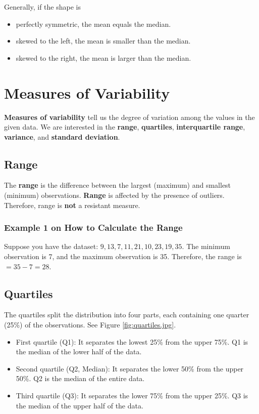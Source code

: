 Generally, if the shape is
\begin{itemize}
    \item perfectly symmetric, the mean equals the median.
    \item skewed to the left, the mean is smaller than the median.
    \item skewed to the right, the mean is larger than the median.
\end{itemize}

\section{Measures of Variability}
\textbf{Measures of variability} tell us the degree of variation among the values in the given data. We are interested in the \textbf{range}, \textbf{quartiles}, \textbf{interquartile range}, \textbf{variance}, and \textbf{standard deviation}.

\subsection{Range}
The \textbf{range} is the difference between the largest (maximum) and smallest (minimum) observations. \textbf{Range} is affected by the presence of outliers. Therefore, range is \textbf{not} a resistant measure.

\subsubsection*{Example 1 on How to Calculate the Range}
Suppose you have the dataset: \( 9, 13, 7, 11, 21, 10, 23, 19, 35 \).
The minimum observation is 7, and the maximum observation is 35. Therefore, the range is \( = 35 - 7 = 28 \).

\subsection{Quartiles}
The quartiles split the distribution into four parts, each containing one quarter (25\%) of the observations. See Figure \ref{fig:quartiles.jpg}.

\begin{itemize}
    \item First quartile (Q1): It separates the lowest 25\% from the upper 75\%. Q1 is the median of the lower half of the data.
    \item Second quartile (Q2, Median): It separates the lower 50\% from the upper 50\%. Q2 is the median of the entire data.
    \item Third quartile (Q3): It separates the lower 75\% from the upper 25\%. Q3 is the median of the upper half of the data.
\end{itemize}



